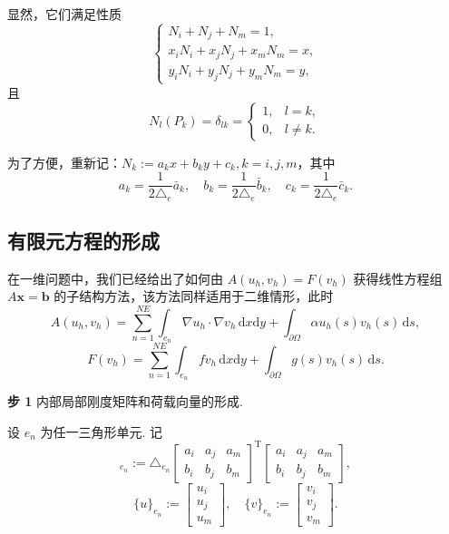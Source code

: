 显然，它们满足性质
\begin{equation*}
\begin{cases}
N_i + N_j + N_m = 1, \\
x_i N_i + x_j N_j + x_m N_m = x, \\
y_i N_i + y_j N_j + y_m N_m = y,
\end{cases}
\end{equation*}
且
\begin{equation*}
N_l(P_k) = \delta_{lk} =
\begin{cases}
1, & l = k, \\
0, & l \ne k.
\end{cases}
\end{equation*}

为了方便，重新记：$N_k := a_k x + b_k y + c_k, k = i,j,m$，其中
\begin{equation*}
a_k = \frac{1}{2\triangle_e}\bar{a}_k, \quad
b_k = \frac{1}{2\triangle_e}\bar{b}_k, \quad
c_k = \frac{1}{2\triangle_e}\bar{c}_k.
\end{equation*}

\subsection{有限元方程的形成}

在一维问题中，我们已经给出了如何由 $A(u_h, v_h) = F(v_h)$ 获得线性方程组 $A\boldsymbol{x} = \boldsymbol{b}$ 的子结构方法，该方法同样适用于二维情形，此时
\begin{equation}
A(u_h, v_h) = \sum_{n=1}^{NE}\int_{e_n} \nabla u_h \cdot \nabla v_h \, \mathrm{d}x\mathrm{d}y + \int_{\partial\Omega} \alpha u_h(s)v_h(s) \, \mathrm{d}s, \label{eq:Ahuhvh}
\end{equation}
\begin{equation}
F(v_h) = \sum_{n=1}^{NE}\int_{e_n} f v_h \, \mathrm{d}x\mathrm{d}y + \int_{\partial\Omega} g(s)v_h(s) \, \mathrm{d}s.
\end{equation}

\textbf{步 1} 内部局部刚度矩阵和荷载向量的形成.\par
设 $e_n$ 为任一三角形单元. 记
\begin{equation*}
[\bar{K}]_{e_n} := \triangle_{e_n}
\begin{bmatrix}
a_i & a_j & a_m \\
b_i & b_j & b_m
\end{bmatrix}^{\mathrm{T}}
\begin{bmatrix}
a_i & a_j & a_m \\
b_i & b_j & b_m
\end{bmatrix},
\end{equation*}
\begin{equation*}
\{u\}_{e_n} :=
\begin{bmatrix}
u_i \\ u_j \\ u_m
\end{bmatrix},
\quad
\{v\}_{e_n} :=
\begin{bmatrix}
v_i \\ v_j \\ v_m
\end{bmatrix}.
\end{equation*}

